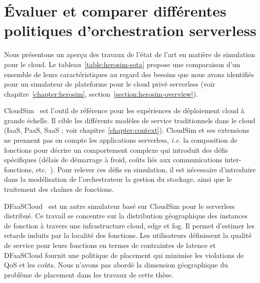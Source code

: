 \section{Évaluer et comparer différentes politiques d'orchestration serverless}
\label{section:sota-herosim}


Nous présentons un aperçu des travaux de l'état de l'art en matière de simulation pour le cloud. Le tableau~\ref{table:herosim-sota} propose une comparaison d'un ensemble de leurs caractéristiques au regard des besoins que nous avons identifiés pour un simulateur de plateforme pour le cloud privé serverless (voir chapitre~\ref{chapter:herosim}, section~\ref{section:herosim-overview}).

CloudSim~\cite{calheiros_cloudsim_2011} est l'outil de référence pour les expériences de déploiement cloud à grande échelle. Il cible les différents modèles de service traditionnels dans le cloud (\gls{IaaS}, \gls{PaaS}, \gls{SaaS} ; voir chapitre~\ref{chapter:context}).
CloudSim et ses extensions~\cite{calheiros_cloudsim_2011, mampage_cloudsimsc_2023, wickremasinghe_cloudanalyst_2010, jeonCloudSimExtensionSimulatingDistributed2019} ne prennent pas en compte les applications serverless, \textit{i.e.} la composition de fonctions pour décrire un comportement complexe qui introduit des défis spécifiques (délais de démarrage à froid, coûts liés aux communications inter-fonctions, etc.~\cite{wawrzoniakBoxerDataAnalytics2021a}).
Pour relever ces défis en simulation, il est nécessaire d'introduire dans la modélisation de l'orchestrateur la gestion du stockage, ainsi que le traitement des chaînes de fonctions.

DFaaSCloud~\cite{jeonCloudSimExtensionSimulatingDistributed2019} est un autre simulateur basé sur CloudSim pour le serverless distribué. Ce travail se concentre sur la distribution géographique des instances de fonction à travers une infrastructure cloud, edge et fog. Il permet d'estimer les retards induits par la localité des fonctions. Les utilisateurs définissent la qualité de service pour leurs fonctions en termes de contraintes de latence et DFaaSCloud fournit une politique de placement qui minimise les violations de \gls{QoS} et les coûts. Nous n'avons pas abordé la dimension géographique du problème de placement dans les travaux de cette thèse.


